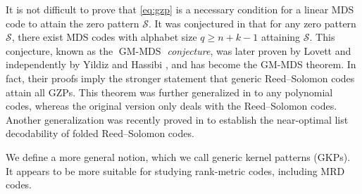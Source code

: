 \documentclass[11pt]{article}
\theoremstyle{plain}
\theoremstyle{definition}
\theoremstyle{remark}
\newcommand{\F}{\mathbb{F}}
\begin{document}
It is not difficult to prove that \eqref{eq:gzp} is a necessary condition for a linear MDS code to attain the zero pattern $\mathcal{S}$. It was conjectured in \cite{dau2014simple} that for any zero pattern $\mathcal{S}$, there exist MDS codes with alphabet size $q\ge n+k-1$ attaining $\mathcal{S}$.
This conjecture, known as the \emph{$\operatorname{GM-MDS}$ conjecture}, was later proven by Lovett \cite{lovett2018mds} and independently by Yildiz and Hassibi \cite{yildiz2019optimum}, and has become the GM-MDS theorem.
In fact, their proofs imply the stronger statement that generic Reed--Solomon codes attain all GZPs. This theorem was further generalized in \cite{brakensiek2023generalized} to any polynomial codes, whereas the original version only deals with the Reed--Solomon codes. Another generalization was recently proved in \cite{ron2024efficient} to establish the near-optimal list decodability of folded Reed--Solomon codes.

We define a more general notion, which we call generic kernel patterns (GKPs). It appears to be more suitable for studying rank-metric codes, including MRD codes.
\end{document}
